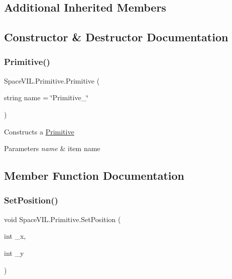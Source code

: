 \subsection*{Additional Inherited Members}


\subsection{Constructor \& Destructor Documentation}
\mbox{\label{class_space_v_i_l_1_1_primitive_a85367e24ebd62b92a6320e87552b81f9}} 
\subsubsection{\texorpdfstring{Primitive()}{Primitive()}}
{\footnotesize\ttfamily Space\+V\+I\+L.\+Primitive.\+Primitive (\begin{DoxyParamCaption}\item[{string}]{name = {\ttfamily \char`\"{}Primitive\+\_\+\char`\"{}} }\end{DoxyParamCaption})\hspace{0.3cm}{\ttfamily [inline]}}



Constructs a \mbox{\hyperlink{class_space_v_i_l_1_1_primitive}{Primitive}} 


\begin{DoxyParams}{Parameters}
{\em name} & item name \\
\hline
\end{DoxyParams}


\subsection{Member Function Documentation}
\mbox{\label{class_space_v_i_l_1_1_primitive_a65b7f60596ee1c79c447febdd2e8fdde}} 
\subsubsection{\texorpdfstring{Set\+Position()}{SetPosition()}}
{\footnotesize\ttfamily void Space\+V\+I\+L.\+Primitive.\+Set\+Position (\begin{DoxyParamCaption}\item[{int}]{\+\_\+x,  }\item[{int}]{\+\_\+y }\end{DoxyParamCaption})\hspace{0.3cm}{\ttfamily [inline]}}



